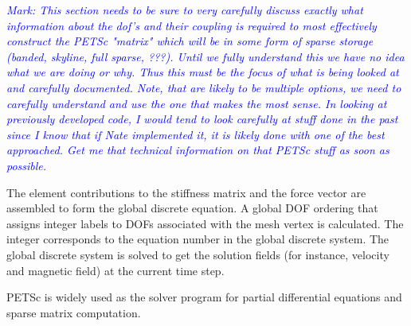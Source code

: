 \documentclass[11pt]{article}  %
\begin{document}
\textit{\textcolor{blue}{Mark: This section needs to be sure to very carefully discuss
exactly what information about the dof's and their coupling is required
to most effectively construct the PETSc "matrix" which will be in some
form of sparse storage (banded, skyline, full sparse, ???). Until we
fully understand this we have no idea what we are doing or why. Thus
this must be the focus of what is being looked at and carefully
documented. Note, that are likely to be multiple options, we need to
carefully understand and use the one that makes the most sense.
In looking at previously developed code, I would tend to look carefully
at stuff done in the past since I know that if Nate implemented it, it
is likely done with one of the best approached.
Get me that technical information on that PETSc stuff as soon as possible.}}

The element contributions to the stiffness matrix and the force vector are assembled to form the global discrete equation. A global DOF ordering that assigns integer labels to DOFs associated with the mesh vertex is calculated. The integer corresponds to the equation number in the global discrete system.  The global discrete system is solved to get the solution fields (for instance, velocity and magnetic field) at the current time step.


PETSc is  widely used as the solver program for partial differential equations and sparse matrix computation. 
\end{document}
